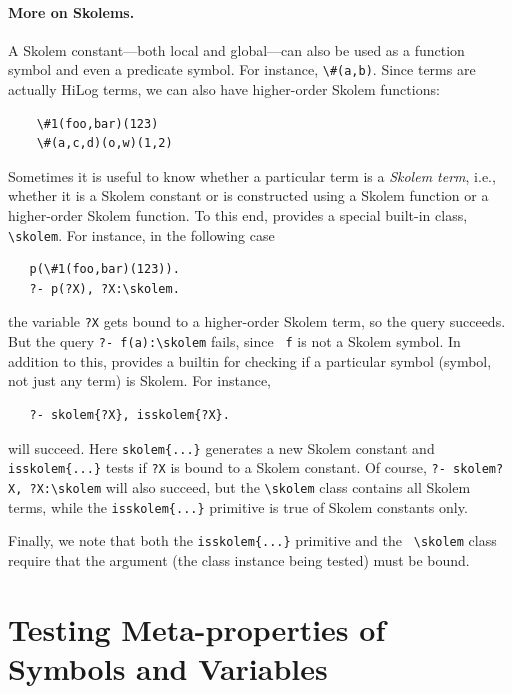 \documentclass[11pt]{article}
\newcommand{\ERGO}{\mbox{\smaller{\ensuremath{\cal{E}}\smaller{{\sc{RGO}}}}}\xspace}
\newcommand{\FLSYSTEM}{\ERGO}
\newcommand{\bs}{\textbackslash}
\begin{document}
\paragraph{More on Skolems.}
A Skolem constant---both local and global---can also be used as a function symbol and even a
predicate symbol.
For instance,
{\tt \bs{}\#(a,b)}. Since \FLSYSTEM terms are actually HiLog terms, we can also
have higher-order Skolem functions:
\begin{verbatim}
    \#1(foo,bar)(123)
    \#(a,c,d)(o,w)(1,2)
\end{verbatim}
\index{\bs{}skolem class}
Sometimes it is useful to know whether a particular term
is a \emph{Skolem term}, i.e., whether it is a Skolem constant or is
constructed using a Skolem function or a higher-order Skolem function.
To this end, \FLSYSTEM provides a special built-in class, {\tt \bs{}skolem}. 
For instance, in the following case
\begin{verbatim}
   p(\#1(foo,bar)(123)).
   ?- p(?X), ?X:\skolem.
\end{verbatim}
the variable {\tt ?X} gets bound to a higher-order Skolem term, so 
the query succeeds. But the query {\tt ?- f(a):\bs{}skolem} fails, since {\tt
  f} is not a Skolem symbol.  
In addition to this, \FLSYSTEM provides a builtin for checking if a particular
symbol (symbol, not just any term) is Skolem. For instance,
\begin{verbatim}
   ?- skolem{?X}, isskolem{?X}.
\end{verbatim}
will succeed.
Here \texttt{skolem\{...\}} generates a new Skolem constant and
\texttt{isskolem\{...\}} tests if \texttt{?X} is bound to a Skolem constant.   
Of course, {\tt ?- skolem{?X}, ?X:\bs{}skolem}   
will also succeed, but the {\tt \bs{}skolem} class contains all Skolem terms,
while the {\tt isskolem\{...\}} primitive is true of Skolem constants only.

Finally, we note that both the {\tt isskolem\{...\}} primitive and the {\tt
  \bs{}skolem} class require that the argument (the class
instance being tested) must be bound.


\section{Testing Meta-properties of Symbols and Variables}
\end{document}
